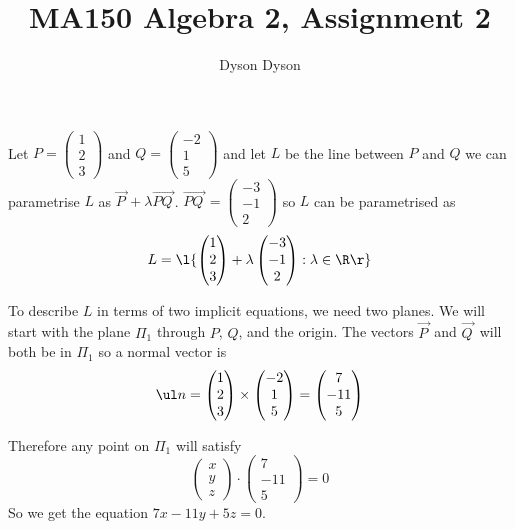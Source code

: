 \documentclass[a4paper]{article}
\title{MA150 Algebra 2, Assignment 2}
\author{Dyson Dyson}
\date{}
\begin{document}
\maketitle

\setlength{\parindent}{0em}
\setlength{\parskip}{1em}

Let $P = \begin{pmatrix}1\\ 2\\ 3\end{pmatrix}$ and $Q = \begin{pmatrix}-2\\ 1\\ 5\end{pmatrix}$ and let $L$ be the line between $P$ and $Q$ we can parametrise $L$ as $\overrightarrow{P\,} + \lambda \overrightarrow{PQ\,}$. $\overrightarrow{PQ\,} = \begin{pmatrix}-3\\ -1\\ 2\end{pmatrix}$ so $L$ can be parametrised as $$L = \l\{ \begin{pmatrix}1\\ 2\\ 3\end{pmatrix} + \lambda \begin{pmatrix}-3\\ -1\\ 2\end{pmatrix} : \lambda \in \R \r\}$$

To describe $L$ in terms of two implicit equations, we need two planes. We will start with the plane $\Pi_1$ through $P$, $Q$, and the origin. The vectors $\overrightarrow{P\,}$ and $\overrightarrow{Q\,}$ will both be in $\Pi_1$ so a normal vector is $$\ul n = \begin{pmatrix}1\\ 2\\ 3\end{pmatrix} \times \begin{pmatrix}-2\\ 1\\ 5\end{pmatrix} = \begin{pmatrix}7\\ -11\\ 5\end{pmatrix}$$

Therefore any point on $\Pi_1$ will satisfy $$\begin{pmatrix}x\\ y\\ z\end{pmatrix} \cdot \begin{pmatrix}7\\ -11\\ 5\end{pmatrix} = 0$$
So we get the equation $7x - 11y + 5z = 0$.
\end{document}
